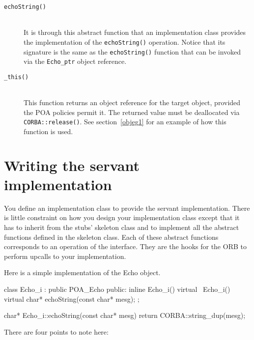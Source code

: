 \documentclass[11pt,twoside,a4paper]{book}
\newcommand{\type}[1]{\texttt{#1}}
\newcommand{\op}[1]{\texttt{#1()}}
\newcommand{\dsc}{\discretionary{}{}{}}
\begin{document}
\begin{description}

\item[\op{echoString}]\mbox{}\\
%
It is through this abstract function that an implementation class
provides the implementation of the \op{echoString} operation. Notice
that its signature is the same as the \op{echoString} function that
can be invoked via the \type{Echo\_ptr} object reference.

\item[\op{\_this}]\mbox{}\\
%
This function returns an object reference for the target object,
provided the POA policies permit it. The returned value must be
deallocated via \op{CORBA::\dsc{}release}.  See section~\ref{objeg1}
for an example of how this function is used.

\end{description}

\section{Writing the servant implementation}
\label{objimpl}

You define an implementation class to provide the servant
implementation. There is little constraint on how you design your
implementation class except that it has to inherit from the stubs'
skeleton class and to implement all the abstract functions defined in
the skeleton class. Each of these abstract functions corresponds to an
operation of the interface. They are the hooks for the ORB to perform
upcalls to your implementation.

Here is a simple implementation of the Echo object.

\begin{cxxlisting}
class Echo_i : public POA_Echo
{
public:
  inline Echo_i() {}
  virtual ~Echo_i() {}
  virtual char* echoString(const char* mesg);
};

char* Echo_i::echoString(const char* mesg)
{
  return CORBA::string_dup(mesg);
}
\end{cxxlisting}

There are four points to note here:
\end{document}
